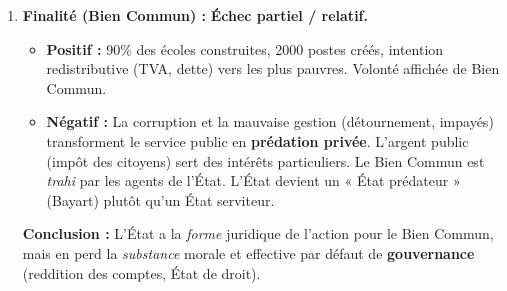 \documentclass[11pt]{article}
\begin{document}
\begin{exoresolu}
\begin{enumerate}
\begin{itemize}
    \end{itemize}
    \item \textbf{Finalité (Bien Commun) :} \textbf{Échec partiel / relatif.}
    \begin{itemize}
        \item \textbf{Positif :} 90\% des écoles construites, 2000 postes créés, intention redistributive (TVA, dette) vers les plus pauvres. Volonté affichée de Bien Commun.
        \item \textbf{Négatif :} La corruption et la mauvaise gestion (détournement, impayés) transforment le service public en \textbf{prédation privée}. L'argent public (impôt des citoyens) sert des intérêts particuliers. Le Bien Commun est \emph{trahi} par les agents de l'État. L'État devient un « État prédateur » (Bayart) plutôt qu'un État serviteur.
    \end{itemize}
    \textbf{Conclusion :} L'État a la \emph{forme} juridique de l'action pour le Bien Commun, mais en perd la \emph{substance} morale et effective par défaut de \textbf{gouvernance} (reddition des comptes, État de droit).
\end{enumerate}
\end{exoresolu}
\end{document}
